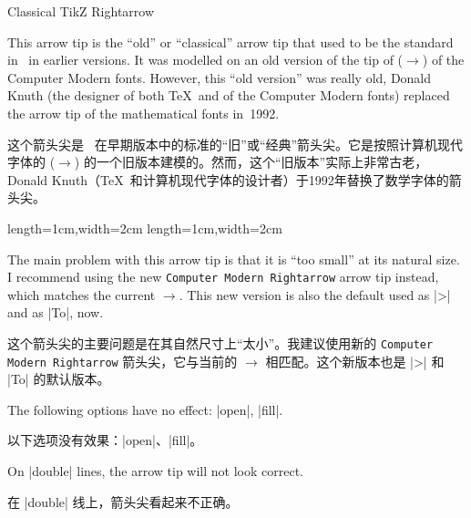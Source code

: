 \begin{arrowtip}{Classical TikZ Rightarrow}{
    This arrow tip is the ``old'' or ``classical'' arrow tip that used to be
    the standard in \tikzname\ in earlier versions. It was modelled on an old
    version of the tip of \texttt{\string\rightarrow} ($\rightarrow$) of the
    Computer Modern fonts. However, this ``old version'' was really old, Donald
    Knuth (the designer of both \TeX\ and of the Computer Modern fonts)
    replaced the arrow tip of the mathematical fonts in~1992.

    这个箭头尖是 \tikzname\ 在早期版本中的标准的“旧”或“经典”箭头尖。它是按照计算机现代字体的 \texttt{\string\rightarrow} ($\rightarrow$) 的一个旧版本建模的。然而，这个“旧版本”实际上非常古老，Donald Knuth（\TeX\ 和计算机现代字体的设计者）于1992年替换了数学字体的箭头尖。
}%
{length=1cm,width=2cm}%
{length=1cm,width=2cm}

    The main problem with this arrow tip is that it is ``too small'' at its
    natural size. I recommend using the new \texttt{Computer Modern Rightarrow}
    arrow tip instead, which matches the current $\to$. This new version is
    also the default used as |>| and as |To|, now.

    这个箭头尖的主要问题是在其自然尺寸上“太小”。我建议使用新的 \texttt{Computer Modern Rightarrow} 箭头尖，它与当前的 $\to$ 相匹配。这个新版本也是 |>| 和 |To| 的默认版本。

    \begin{arrowexamples}
        \arrowexample[]
        \arrowexampledup[sep]
        \arrowexampledupdot[sep]
        \arrowexample[length=3pt]
        \arrowexample[sharp]
        \arrowexample[slant=.3]
        \arrowexample[left]
        \arrowexample[right]
        \arrowexample[red]
    \end{arrowexamples}
    The following options have no effect: |open|, |fill|.

    以下选项没有效果：|open|、|fill|。



    On |double| lines, the arrow tip will not look correct.

    在 |double| 线上，箭头尖看起来不正确。

\end{arrowtip}

